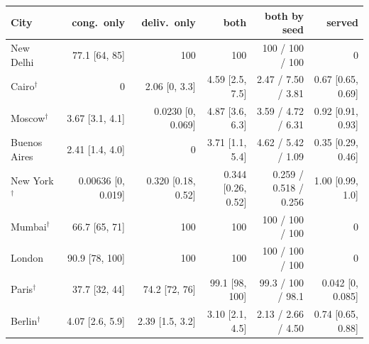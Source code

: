 \begin{tabular}{lrrrrr}
\toprule
City & cong.\ only & deliv.\ only & both & both by seed & served \\
\midrule
New Delhi & 77.1 [64, 85] & 100 & 100 & 100 / 100 / 100 & 0 \\
Cairo$^\dagger$ & 0 & 2.06 [0, 3.3] & 4.59 [2.5, 7.5] & 2.47 / 7.50 / 3.81 & 0.67 [0.65, 0.69] \\
Moscow$^\dagger$ & 3.67 [3.1, 4.1] & 0.0230 [0, 0.069] & 4.87 [3.6, 6.3] & 3.59 / 4.72 / 6.31 & 0.92 [0.91, 0.93] \\
Buenos Aires & 2.41 [1.4, 4.0] & 0 & 3.71 [1.1, 5.4] & 4.62 / 5.42 / 1.09 & 0.35 [0.29, 0.46] \\
New York$^\dagger$ & 0.00636 [0, 0.019] & 0.320 [0.18, 0.52] & 0.344 [0.26, 0.52] & 0.259 / 0.518 / 0.256 & 1.00 [0.99, 1.0] \\
Mumbai$^\dagger$ & 66.7 [65, 71] & 100 & 100 & 100 / 100 / 100 & 0 \\
London & 90.9 [78, 100] & 100 & 100 & 100 / 100 / 100 & 0 \\
Paris$^\dagger$ & 37.7 [32, 44] & 74.2 [72, 76] & 99.1 [98, 100] & 99.3 / 100 / 98.1 & 0.042 [0, 0.085] \\
Berlin$^\dagger$ & 4.07 [2.6, 5.9] & 2.39 [1.5, 3.2] & 3.10 [2.1, 4.5] & 2.13 / 2.66 / 4.50 & 0.74 [0.65, 0.88] \\
\bottomrule
\end{tabular}
